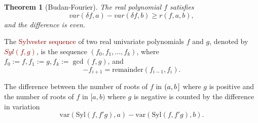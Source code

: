 \documentclass[12pt]{amsart}
\newtheorem{theorem}{Theorem}
\theoremstyle{definition}
\begin{document}
\begin{theorem}[Budan-Fourier] The real polynomial $f$ satisfies $$var(\delta f,a) - var(\delta f,b) \geq r(f,a,b),$$ and the difference is even.\end{theorem}

The \textcolor{Maroon}{Sylvester sequence} of two real univariate polynomials $f$ and $g$, denoted by \textcolor{Maroon}{$Syl(f,g)$}, is the sequence $\left(f_{0},f_{1},\dots,f_{k}\right)$, where $f_{0} := f, f_{1} := g, f_{k} := \gcd(f,g)$, and $$-f_{i+1} = \text{remainder}(f_{i-1},f_{i}).$$

\theorem[Sylvester]
The difference between the number of roots of $f$ in $(a,b\hspace{.05cm}]$ where $g$ is positive and the number of roots of $f$ in $[a,b)$ where $g$ is negative is counted by the difference in variation $$\text{var}(\text{Syl}(f,f'g),a) - \text{var}(\text{Syl}(f,f'g),b).$$
\end{document}
